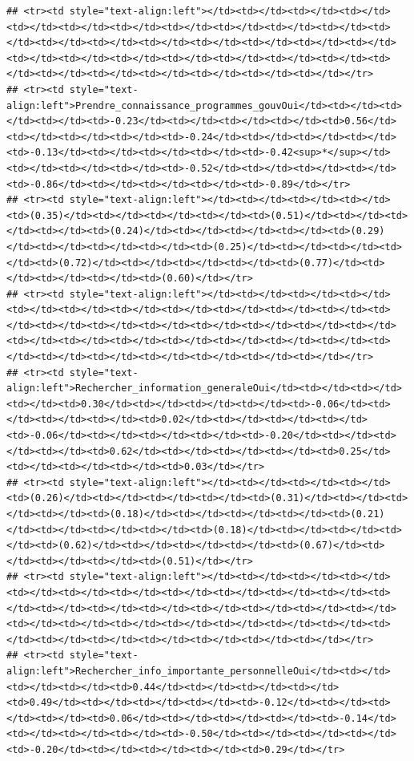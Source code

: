 \documentclass[
]{article}
\begin{document}
\begin{verbatim}
## <tr><td style="text-align:left"></td><td></td><td></td><td></td><td></td><td></td><td></td><td></td><td></td><td></td><td></td><td></td><td></td><td></td><td></td><td></td><td></td><td></td><td></td><td></td><td></td><td></td><td></td><td></td><td></td><td></td><td></td><td></td><td></td><td></td><td></td><td></td><td></td></tr>
## <tr><td style="text-align:left">Prendre_connaissance_programmes_gouvOui</td><td></td><td></td><td></td><td>-0.23</td><td></td><td></td><td></td><td>0.56</td><td></td><td></td><td></td><td>-0.24</td><td></td><td></td><td></td><td>-0.13</td><td></td><td></td><td></td><td>-0.42<sup>*</sup></td><td></td><td></td><td></td><td>-0.52</td><td></td><td></td><td></td><td>-0.86</td><td></td><td></td><td></td><td>-0.89</td></tr>
## <tr><td style="text-align:left"></td><td></td><td></td><td></td><td>(0.35)</td><td></td><td></td><td></td><td>(0.51)</td><td></td><td></td><td></td><td>(0.24)</td><td></td><td></td><td></td><td>(0.29)</td><td></td><td></td><td></td><td>(0.25)</td><td></td><td></td><td></td><td>(0.72)</td><td></td><td></td><td></td><td>(0.77)</td><td></td><td></td><td></td><td>(0.60)</td></tr>
## <tr><td style="text-align:left"></td><td></td><td></td><td></td><td></td><td></td><td></td><td></td><td></td><td></td><td></td><td></td><td></td><td></td><td></td><td></td><td></td><td></td><td></td><td></td><td></td><td></td><td></td><td></td><td></td><td></td><td></td><td></td><td></td><td></td><td></td><td></td><td></td></tr>
## <tr><td style="text-align:left">Rechercher_information_generaleOui</td><td></td><td></td><td></td><td>0.30</td><td></td><td></td><td></td><td>-0.06</td><td></td><td></td><td></td><td>0.02</td><td></td><td></td><td></td><td>-0.06</td><td></td><td></td><td></td><td>-0.20</td><td></td><td></td><td></td><td>0.62</td><td></td><td></td><td></td><td>0.25</td><td></td><td></td><td></td><td>0.03</td></tr>
## <tr><td style="text-align:left"></td><td></td><td></td><td></td><td>(0.26)</td><td></td><td></td><td></td><td>(0.31)</td><td></td><td></td><td></td><td>(0.18)</td><td></td><td></td><td></td><td>(0.21)</td><td></td><td></td><td></td><td>(0.18)</td><td></td><td></td><td></td><td>(0.62)</td><td></td><td></td><td></td><td>(0.67)</td><td></td><td></td><td></td><td>(0.51)</td></tr>
## <tr><td style="text-align:left"></td><td></td><td></td><td></td><td></td><td></td><td></td><td></td><td></td><td></td><td></td><td></td><td></td><td></td><td></td><td></td><td></td><td></td><td></td><td></td><td></td><td></td><td></td><td></td><td></td><td></td><td></td><td></td><td></td><td></td><td></td><td></td><td></td></tr>
## <tr><td style="text-align:left">Rechercher_info_importante_personnelleOui</td><td></td><td></td><td></td><td>0.44</td><td></td><td></td><td></td><td>0.49</td><td></td><td></td><td></td><td>-0.12</td><td></td><td></td><td></td><td>0.06</td><td></td><td></td><td></td><td>-0.14</td><td></td><td></td><td></td><td>-0.50</td><td></td><td></td><td></td><td>-0.20</td><td></td><td></td><td></td><td>0.29</td></tr>

\end{verbatim}
\end{document}
